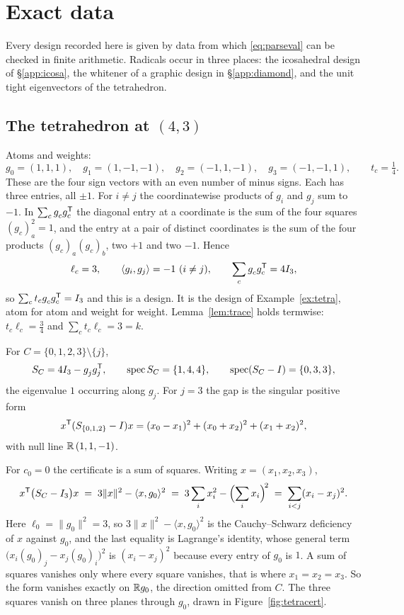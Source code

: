 \section{Exact data}\label{app:data}

Every design recorded here is given by data from which
\eqref{eq:parseval} can be checked in finite arithmetic.  Radicals occur
in three places: the
icosahedral design of \S\ref{app:icosa}, the whitener of a graphic design
in \S\ref{app:diamond}, and the unit tight eigenvectors of the
tetrahedron.

\subsection{The tetrahedron at \texorpdfstring{$(4,3)$}{(4,3)}}\label{app:tetra}

Atoms and weights:
\[
  g_0=(1,1,1),\quad g_1=(1,-1,-1),\quad g_2=(-1,1,-1),\quad g_3=(-1,-1,1),
  \qquad t_c=\tfrac14 .
\]
These are the four sign vectors with an even number of minus signs.  Each
has three entries, all $\pm1$.  For $i\ne j$ the coordinatewise products
of $g_i$ and $g_j$ sum to $-1$.  In
$\sum_c g_c^{\vphantom{\mathsf{T}}}g_c\tp$ the diagonal entry at a
coordinate is the sum of the four squares $(g_c)_a^2=1$, and the entry at a
pair of distinct coordinates is the sum of the four products
$(g_c)_a(g_c)_b$, two $+1$ and two $-1$.  Hence
\[
  \ell_c=3,\qquad \langle g_i,g_j\rangle=-1 \ (i\ne j),
  \qquad \sum_c g_c^{\vphantom{\mathsf{T}}}g_c\tp=4I_3 ,
\]
so $\sum_c t_c g_c^{\vphantom{\mathsf{T}}}g_c\tp=I_3$ and this is a design.  It is the
design of Example~\ref{ex:tetra}, atom for atom and weight for weight.
Lemma~\ref{lem:trace} holds termwise: $t_c\ell_c=\tfrac34$ and
$\sum_c t_c\ell_c=3=k$.

For $C=\{0,1,2,3\}\setminus\{j\}$,
\[
  \SC=4I_3-g_j^{\vphantom{\mathsf{T}}}g_j\tp,
  \qquad
  \operatorname{spec}\SC=\{1,4,4\},
  \qquad
  \operatorname{spec}(\SC-I)=\{0,3,3\},
\]
the eigenvalue $1$ occurring along $g_j$.  For $j=3$ the gap is the singular
positive form
\[
  x^{\mathsf{T}}(S_{\{0,1,2\}}-I)x=(x_0-x_1)^2+(x_0+x_2)^2+(x_1+x_2)^2 ,
\]
with null line $\mathbb{R}\,(1,1,-1)$.

For $c_0=0$ the certificate is a sum of squares.  Writing
$x=(x_1,x_2,x_3)$,
\[
  x^{\mathsf{T}}\bigl(S_{C}-I_3\bigr)x
  \;=\;3\lVert x\rVert^2-\langle x,g_0\rangle^2
  \;=\;3\sum_i x_i^2-\Bigl(\sum_i x_i\Bigr)^{\!2}
  \;=\;\sum_{i<j}(x_i-x_j)^2 .
\]
Here $\ell_0=\lVert g_0\rVert^2=3$, so
$3\lVert x\rVert^2-\langle x,g_0\rangle^2$ is the Cauchy--Schwarz
deficiency of $x$ against $g_0$, and the last equality is Lagrange's
identity, whose general term $\bigl(x_i(g_0)_j-x_j(g_0)_i\bigr)^2$ is
$(x_i-x_j)^2$ because every entry of $g_0$ is $1$.  A sum of squares
vanishes only where every square vanishes, that is where $x_1=x_2=x_3$.
So the form vanishes exactly on $\mathbb{R} g_0$, the direction omitted from $C$.
The three squares vanish on three planes through $g_0$, drawn in
Figure~\ref{fig:tetracert}.

